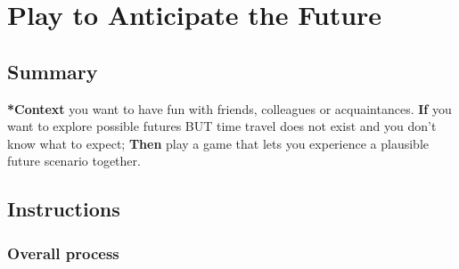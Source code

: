 \documentclass[11pt]{article}
\begin{document}
\section{Play to Anticipate the Future}
\label{85fefbc1-ca57-46fa-a8b2-154821a56c75}
\subsection{Summary}
\label{sec:orga288b15}

\textbf{*Context} you want to have fun with friends, colleagues or
acquaintances. \textbf{If} you want to explore possible futures BUT time travel
does not exist and you don't know what to expect; \textbf{Then} play a game
that lets you experience a plausible future scenario together.

\subsection{Instructions}
\label{sec:org8b6051f}

\subsubsection{Overall process}
\label{sec:org6528878}
\end{document}
